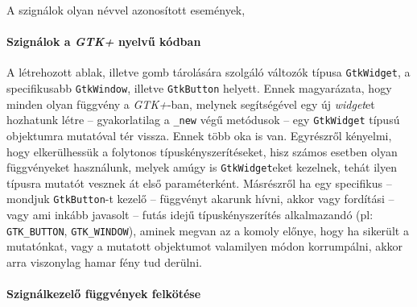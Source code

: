 A szignálok olyan névvel azonosított események, 

\paragraph{Szignálok a \textit{GTK+} nyelvű kódban}

\begin{description}
 \item[\ref{gtksignalc:widgetcreatebegin} - \ref{gtksignalc:widgetcreateend} sor] A létrehozott ablak, illetve gomb tárolására szolgáló változók típusa \texttt{GtkWidget}, a specifikusabb \texttt{GtkWindow}, illetve \texttt{GtkButton} helyett. Ennek magyarázata, hogy minden olyan függvény a \textit{GTK+}-ban, melynek segítségével egy új \textit{widget}et hozhatunk létre -- gyakorlatilag a \texttt{\_new} végű metódusok -- egy \texttt{GtkWidget} típusú objektumra mutatóval tér vissza. Ennek több oka is van. Egyrészről kényelmi, hogy elkerülhessük a folytonos típuskényszerítéseket, hisz számos esetben olyan függvényeket használunk, melyek amúgy is \texttt{GtkWidget}eket kezelnek, tehát ilyen típusra mutatót vesznek át első paraméterként. Másrészről ha egy specifikus -- mondjuk \texttt{GtkButton}-t kezelő -- függvényt akarunk hívni, akkor vagy fordítási -- vagy ami inkább javasolt -- futás idejű típuskényszerítés alkalmazandó (pl: \texttt{GTK\_BUTTON}, \texttt{GTK\_WINDOW}), aminek megvan az a komoly előnye, hogy ha sikerült a mutatónkat, vagy a mutatott objektumot valamilyen módon korrumpálni, akkor arra viszonylag hamar fény tud derülni.
\end{description}

\paragraph{Szignálkezelő függvények felkötése}

